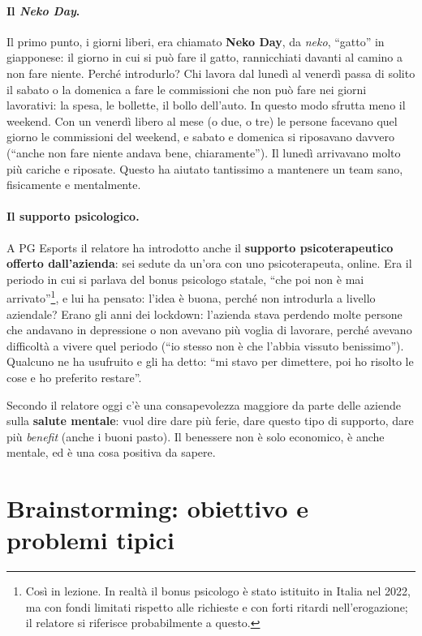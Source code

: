 \paragraph{Il \emph{Neko Day}.} Il primo punto, i giorni liberi, era chiamato
\textbf{Neko Day}, da \emph{neko}, ``gatto'' in giapponese: il giorno in cui si può
fare il gatto, rannicchiati davanti al camino a non fare niente. Perché
introdurlo? Chi lavora dal lunedì al venerdì passa di solito il sabato o la domenica
a fare le commissioni che non può fare nei giorni lavorativi: la spesa, le bollette,
il bollo dell'auto. In questo modo sfrutta meno il weekend. Con un venerdì libero al
mese (o due, o tre) le persone facevano quel giorno le commissioni del weekend, e
sabato e domenica si riposavano davvero (``anche non fare niente andava bene,
chiaramente''). Il lunedì arrivavano molto più cariche e riposate. Questo ha aiutato
tantissimo a mantenere un team sano, fisicamente e mentalmente.

\paragraph{Il supporto psicologico.} A PG Esports il relatore ha introdotto anche il
\textbf{supporto psicoterapeutico offerto dall'azienda}: sei sedute da un'ora con
uno psicoterapeuta, online. Era il periodo in cui si parlava del bonus psicologo
statale, ``che poi non è mai arrivato''\footnote{Così in lezione. In realtà il bonus
psicologo è stato istituito in Italia nel 2022, ma con fondi limitati rispetto alle
richieste e con forti ritardi nell'erogazione; il relatore si riferisce
probabilmente a questo.}, e lui ha pensato: l'idea è buona, perché non introdurla a
livello aziendale? Erano gli anni dei lockdown: l'azienda stava perdendo molte persone
che andavano in depressione o non avevano più voglia di lavorare, perché avevano
difficoltà a vivere quel periodo (``io stesso non è che l'abbia vissuto benissimo'').
Qualcuno ne ha usufruito e gli ha detto: ``mi stavo per dimettere, poi ho risolto le
cose e ho preferito restare''.

Secondo il relatore oggi c'è una consapevolezza maggiore da parte delle aziende
sulla \textbf{salute mentale}: vuol dire dare più ferie, dare questo tipo di
supporto, dare più \emph{benefit} (anche i buoni pasto). Il benessere non è solo
economico, è anche mentale, ed è una cosa positiva da sapere.

\section{Brainstorming: obiettivo e problemi tipici}
\label{sec:z2-brainstorming}

